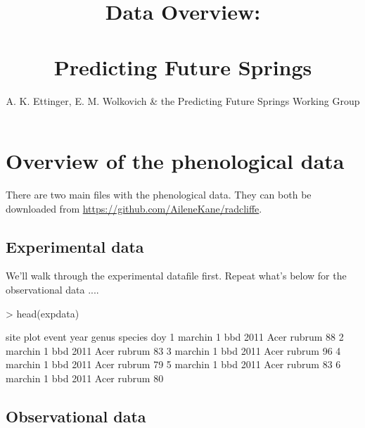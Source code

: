 \documentclass{article}
\begin{document}

% 

\title{Data Overview: \\ \\ Predicting Future Springs} %
\author{A. K. Ettinger, E. M. Wolkovich \& the Predicting Future Springs Working Group}
\maketitle  %
\renewcommand{\thetable}{S\arabic{table}}
\renewcommand{\thefigure}{S\arabic{figure}}
\renewcommand{\labelitemi}{$-$}

\section {Overview of the phenological data}

There are two main files with the phenological data. They can both be downloaded from \url{https://github.com/AileneKane/radcliffe}.

\subsection{Experimental data}



We'll walk through the experimental datafile first. Repeat what's below for the observational data ....

\begin{Schunk}
\begin{Sinput}
> head(expdata)
\end{Sinput}
\begin{Soutput}
     site plot event year genus species doy
1 marchin    1   bbd 2011  Acer  rubrum  88
2 marchin    1   bbd 2011  Acer  rubrum  83
3 marchin    1   bbd 2011  Acer  rubrum  96
4 marchin    1   bbd 2011  Acer  rubrum  79
5 marchin    1   bbd 2011  Acer  rubrum  83
6 marchin    1   bbd 2011  Acer  rubrum  80
\end{Soutput}
\end{Schunk}

\subsection{Observational data}
\end{document}
